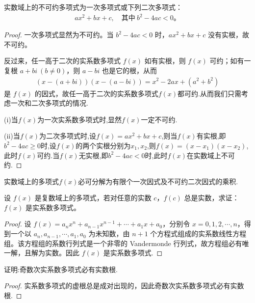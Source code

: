 \documentclass[lang=cn,newtx,10pt,scheme=chinese]{elegantbook}
\begin{document}
\begin{corollary}
实数域上的不可约多项式为一次多项式或下列二次多项式：
\begin{align*}
ax^2 + bx + c, \quad \text{其中} \ b^2 - 4ac < 0。
\end{align*}
\end{corollary}
\begin{proof}
一次多项式显然为不可约。当 $b^2 - 4ac < 0$ 时，$ax^2 + bx + c$ 没有实根，故不可约。

反过来，任一高于二次的实系数多项式 $f(x)$ 如有实根，则 $f(x)$ 可约；如有一复根 $a + bi \ (b \neq 0)$，则 $a - bi$ 也是它的根，从而
\begin{align*}
(x - (a + bi))(x - (a - bi)) = x^2 - 2ax + (a^2 + b^2)
\end{align*}
是 $f(x)$ 的因式，故任一高于二次的实系数多项式$f(x)$都可约.从而我们只需考虑一次和二次多项式的情况.

(i)当$f(x)$为一次实系数多项式时,显然$f(x)$一定不可约.

(ii)当$f(x)$为二次多项式时,设$f(x)=ax^2+bx+c$,则当$f(x)$有实根,即$b^2-4ac\geq 0$时,设$f(x)$的两个实根分别为$x_1,x_2$,则$f(x)=(x-x_1)(x-x_2)$,此时$f(x)$可约.当$f(x)$无实根,即$b^2-4ac<0$时,此时$f(x)$在实数域上不可约.
\end{proof}

\begin{corollary}
实数域上的多项式$f(x)$必可分解为有限个一次因式及不可约二次因式的乘积.
\end{corollary}

\begin{proposition}\label{proposition:实系数多项式的判定条件}
设 $f(x)$ 是复数域上的多项式，若对任意的实数 $c$，$f(c)$ 总是实数，求证：$f(x)$ 是实系数多项式。
\end{proposition}
\begin{proof}
设 $f(x) = a_n x^n + a_{n-1} x^{n-1} + \cdots + a_1 x + a_0$，分别令 $x = 0, 1, 2, \cdots, n$，得到一个以 $a_n, a_{n-1}, \cdots, a_1, a_0$ 为未知数，由 $n + 1$ 个方程式组成的实系数线性方程组。该方程组的系数行列式是一个非零的 Vandermonde 行列式，故方程组必有唯一解，且解为实数。因此 $f(x)$ 是实系数多项式.
\end{proof}

\begin{example}
证明:奇数次实系数多项式必有实数根.
\end{example}
\begin{proof}
实系数多项式的虚根总是成对出现的，因此奇数次实系数多项式必有实数根.
\end{proof}
\end{document}
